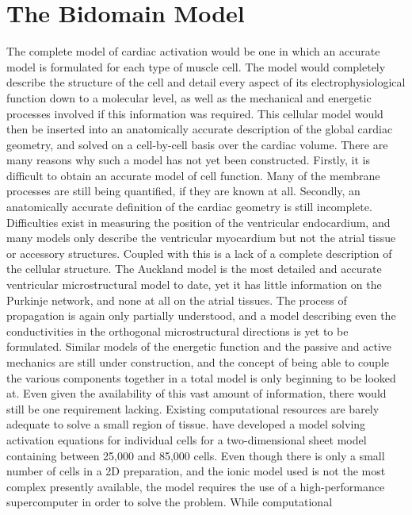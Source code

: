\section{The Bidomain Model}
\label{sec:bidomain-model}

The complete model of cardiac activation would be one in which an
accurate model is formulated for each type of muscle cell.  The model
would completely describe the structure of the cell and detail every
aspect of its electrophysiological function down to a molecular level,
as well as the mechanical and energetic processes involved if this
information was required.  This cellular model would then be inserted
into an anatomically accurate description of the global cardiac
geometry, and solved on a cell-by-cell basis over the cardiac volume.
There are many reasons why such a model has not yet been constructed.
Firstly, it is difficult to obtain an accurate model of cell function.
Many of the membrane processes are still being quantified, if they are
known at all.  Secondly, an anatomically accurate definition of the
cardiac geometry is still incomplete.  Difficulties exist in measuring
the position of the ventricular endocardium, and many models only
describe the ventricular myocardium but not the atrial tissue or
accessory structures.  Coupled with this is a lack of a complete
description of the cellular structure.  The Auckland model is the most
detailed and accurate ventricular microstructural model to date, yet
it has little information on the Purkinje network, and none at all on
the atrial tissues.  The process of propagation is again only
partially understood, and a model describing even the conductivities
in the orthogonal microstructural directions is yet to be formulated.
Similar models of the energetic function and the passive and active
mechanics are still under construction, and the concept of being able
to couple the various components together in a total model is only
beginning to be looked at.  Even given the availability of this vast
amount of information, there would still be one requirement lacking.
Existing computational resources are barely adequate to solve a small
region of tissue.   have developed a
model solving activation equations for individual cells for a
two-dimensional sheet model containing between 25,000 and 85,000
cells.  Even though there is only a small number of cells in a 2D
preparation, and the ionic model used is not the most complex
presently available, the model requires the use of a high-performance
supercomputer in order to solve the problem.  While computational

